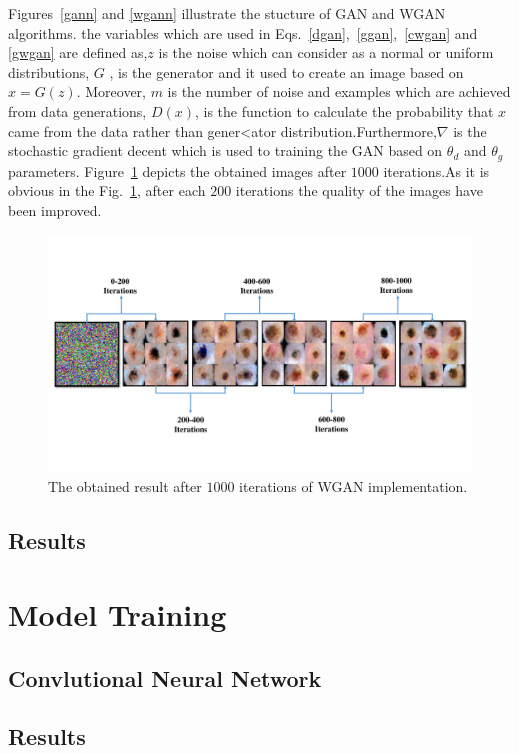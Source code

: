\documentclass[conference]{IEEEtran}
\begin{document}
Figures~\ref{gann} and \ref{wgann} illustrate the stucture of GAN and WGAN algorithms.
the variables which are used in Eqs.~\ref{dgan},~\ref{ggan},~\ref{cwgan}	and \ref{gwgan} are defined as,$z$ is the noise which can consider as a normal or uniform distributions, $G$ , is the generator and it used to create an image based on $x=G(z)$. Moreover, $m$ is the number of noise and examples which are achieved from data generations, $D(x)$, is the function to calculate the probability that $x$ came from the data rather than gener<ator distribution.Furthermore,$\nabla$ is the stochastic gradient decent which is used to training the GAN based on $\theta_{d}$ and $\theta_{g}$ parameters.
Figure~\ref{itere} depicts the obtained images after $1000$ iterations.As it is obvious in the Fig.~\ref{itere}, after each $200$ iterations the quality of the images have been improved.

\begin{figure}
\centering
\includegraphics[width=1\columnwidth]{iteration.pdf}
\caption{The obtained result after $1000$ iterations of WGAN implementation.}
\label{itere}
\end{figure}
\subsection{Results}
\section{Model Training}
\subsection{Convlutional Neural Network}
\subsection{Results}
\end{document}
